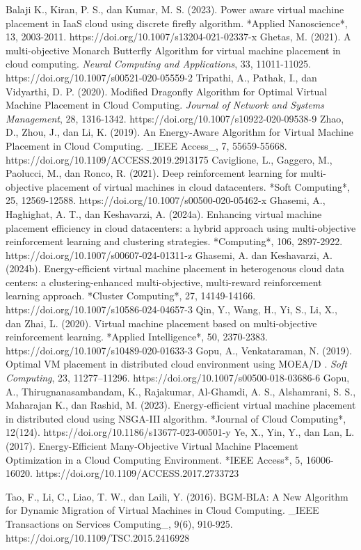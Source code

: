 \begin{thebibliography}{99}
	Balaji K., Kiran, P. S., dan Kumar, M. S. (2023). Power aware virtual machine placement in IaaS cloud using discrete firefly algorithm. *Applied Nanoscience*, 13, 2003-2011. https://doi.org/10.1007/s13204-021-02337-x
	Ghetas, M. (2021). A multi-objective Monarch Butterfly Algorithm for virtual machine placement in cloud computing. \textit{Neural Computing and Applications}, 33, 11011-11025. https://doi.org/10.1007/s00521-020-05559-2 
	Tripathi, A., Pathak, I., dan Vidyarthi, D. P. (2020). Modified Dragonfly Algorithm for Optimal Virtual Machine Placement in Cloud Computing. \textit{Journal of Network and Systems Management}, 28, 1316-1342. https://doi.org/10.1007/s10922-020-09538-9
	Zhao, D., Zhou, J., dan Li, K. (2019). An Energy-Aware Algorithm for Virtual Machine Placement in Cloud Computing. _IEEE Access_, 7, 55659-55668. https://doi.org/10.1109/ACCESS.2019.2913175
	Caviglione, L., Gaggero, M., Paolucci, M., dan Ronco, R. (2021). Deep reinforcement learning for multi-objective placement of virtual machines in cloud datacenters. *Soft Computing*, 25, 12569-12588. https://doi.org/10.1007/s00500-020-05462-x 
	Ghasemi, A., Haghighat, A. T., dan Keshavarzi, A. (2024a). Enhancing virtual machine placement efficiency in cloud datacenters: a hybrid approach using multi-objective reinforcement learning and clustering strategies. *Computing*, 106, 2897-2922. https://doi.org/10.1007/s00607-024-01311-z
	Ghasemi, A. dan Keshavarzi, A. (2024b). Energy-efficient virtual machine placement in heterogenous cloud data centers: a clustering-enhanced multi-objective, multi-reward reinforcement learning approach. *Cluster Computing*, 27, 14149-14166. https://doi.org/10.1007/s10586-024-04657-3
	Qin, Y., Wang, H., Yi, S., Li, X., dan Zhai, L. (2020). Virtual machine placement based on multi-objective reinforcement learning. *Applied Intelligence*, 50, 2370-2383. https://doi.org/10.1007/s10489-020-01633-3 
	Gopu, A., Venkataraman, N. (2019). Optimal VM placement in distributed cloud environment using MOEA/D . \textit{Soft Computing}, 23, 11277–11296. https://doi.org/10.1007/s00500-018-03686-6
	Gopu, A., Thirugnanasambandam, K., Rajakumar, Al-Ghamdi, A. S., Alshamrani, S. S., Maharajan K., dan Rashid, M. (2023). Energy-efficient virtual machine placement in distributed cloud using NSGA-III algorithm. *Journal of Cloud Computing*, 12(124). https://doi.org/10.1186/s13677-023-00501-y 
	Ye, X., Yin, Y., dan Lan, L. (2017). Energy-Efficient Many-Objective Virtual Machine Placement Optimization in a Cloud Computing Environment. *IEEE Access*, 5, 16006-16020. https://doi.org/10.1109/ACCESS.2017.2733723

	Tao, F., Li, C., Liao, T. W., dan Laili, Y. (2016). BGM-BLA: A New Algorithm for Dynamic Migration of Virtual Machines in Cloud Computing. _IEEE Transactions on Services Computing_, 9(6), 910-925. https://doi.org/10.1109/TSC.2015.2416928

	
\end{thebibliography}
